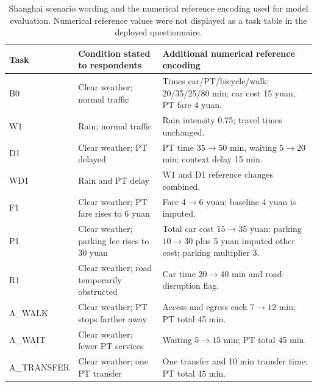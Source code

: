 \begin{table}[pos=htbp]
\centering\footnotesize
\caption{Shanghai scenario wording and the numerical reference encoding used for model evaluation. Numerical reference values were not displayed as a task table in the deployed questionnaire.}
\label{tab:shanghai_cards}
\setlength{\tabcolsep}{4pt}
\renewcommand{\arraystretch}{1.15}
\begin{tabularx}{\textwidth}{@{}lXX@{}}
\toprule
Task & Condition stated to respondents & Additional numerical reference encoding \\
\midrule
B0 & Clear weather; normal traffic & Times car/PT/bicycle/walk: 20/35/25/80 min; car cost 15 yuan, PT fare 4 yuan. \\
W1 & Rain; normal traffic & Rain intensity 0.75; travel times unchanged. \\
D1 & Clear weather; PT delayed & PT time $35\to50$ min, waiting $5\to20$ min; context delay 15 min. \\
WD1 & Rain and PT delay & W1 and D1 reference changes combined. \\
F1 & Clear weather; PT fare rises to 6 yuan & Fare $4\to6$ yuan; baseline 4 yuan is imputed. \\
P1 & Clear weather; parking fee rises to 30 yuan & Total car cost $15\to35$ yuan: parking $10\to30$ plus 5 yuan imputed other cost; parking multiplier 3. \\
R1 & Clear weather; road temporarily obstructed & Car time $20\to40$ min and road-disruption flag. \\
A\_WALK & Clear weather; PT stops farther away & Access and egress each $7\to12$ min; PT total 45 min. \\
A\_WAIT & Clear weather; fewer PT services & Waiting $5\to15$ min; PT total 45 min. \\
A\_TRANSFER & Clear weather; one PT transfer & One transfer and 10 min transfer time; PT total 45 min. \\
\bottomrule
\end{tabularx}
\par{}
\end{table}
